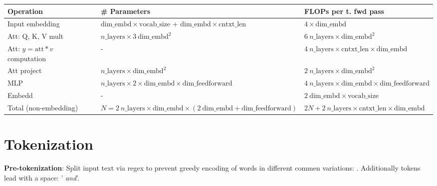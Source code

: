 \begin{multicols}{2}
\begin{mdframed}[style=eqbox]
        \scriptsize
        \begin{tabular}{ p{2cm} p{3cm} p{3cm} }
        \textbf{Operation} & \textbf{# Parameters} & \textbf{FLOPs per t. fwd pass} \\ \hline
        Input embedding & $\text{dim}\_{\text{embd}} \times \text{vocab}\_{\text{size}}$ + $\text{dim}\_{\text{embd}} \times \text{cntxt}\_{\text{len}}$ & $4 \times \text{dim}\_{\text{embd}}$ \\ \hline
        Att: Q, K, V mult & $n\_{\text{layers}} \times 3~\text{dim}\_{\text{embd}}^2$ & $6~n\_{\text{layers}} \times \text{dim}\_{\text{embd}}^2$ \\ \hline
        Att: $y = \text{att} * v$ computation & - & $4~n\_{\text{layers}} \times \text{cntxt}\_{\text{len}} \times \text{dim}\_{\text{embd}}$ \\ \hline
        Att project & $n\_{\text{layers}} \times \text{dim}\_{\text{embd}}^2$ & $2~n\_{\text{layers}} \times \text{dim}\_{\text{embd}}^2$ \\ \hline
        MLP & $n\_{\text{layers}} \times 2 \times \text{dim}\_{\text{embd}} \times \text{dim}\_{\text{feedforward}}$ & $4~n\_{\text{layers}} \times \text{dim}\_{\text{embd}} \times \text{dim}\_{\text{feedforward}}$ \\ \hline
        Embedd & - & $2~\text{dim}\_{\text{embd}} \times \text{vocab}\_{\text{size}}$ \\ \hline
        Total (non-embedding) & $N = 2~n\_{\text{layers}} \times \text{dim}\_{\text{embd}} \times (2~\text{dim}\_{\text{embd}} + \text{dim}\_{\text{feedforward}})$ & $2N + 2~n\_{\text{layers}} \times \text{cntxt}\_{\text{len}} \times \text{dim}\_{\text{embd}}$ \\ \hline
        \end{tabular}
    \end{mdframed}

    \section{Tokenization}
    \begin{mdframed}[style=eqbox]
        \textbf{Pre-tokenization}: Split input text via regex to prevent greedy encoding of words in different commen variations: . Additionally tokens lead with a space: ' \textit{and}'.\\

\end{mdframed}
\end{multicols}
